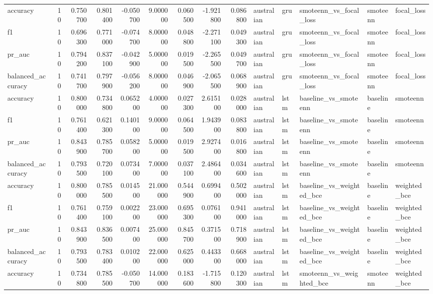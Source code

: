 \begin{tabular}{lrrrrrrrrlllll}
accuracy & 10 & 0.750700 & 0.801400 & -0.050700 & 9.000000 & 0.060500 & -1.921800 & 0.086800 & australian & gru & smoteenn_vs_focal_loss & smoteenn & focal_loss \\
f1 & 10 & 0.696300 & 0.771000 & -0.074700 & 8.000000 & 0.048800 & -2.271100 & 0.049300 & australian & gru & smoteenn_vs_focal_loss & smoteenn & focal_loss \\
pr_auc & 10 & 0.794200 & 0.837100 & -0.042900 & 5.000000 & 0.019500 & -2.265500 & 0.049700 & australian & gru & smoteenn_vs_focal_loss & smoteenn & focal_loss \\
balanced_accuracy & 10 & 0.741700 & 0.797900 & -0.056200 & 8.000000 & 0.046900 & -2.065500 & 0.068900 & australian & gru & smoteenn_vs_focal_loss & smoteenn & focal_loss \\
accuracy & 10 & 0.800000 & 0.734800 & 0.065200 & 4.000000 & 0.027300 & 2.615100 & 0.028000 & australian & lstm & baseline_vs_smoteenn & baseline & smoteenn \\
f1 & 10 & 0.761400 & 0.621300 & 0.140100 & 9.000000 & 0.064500 & 1.943900 & 0.083800 & australian & lstm & baseline_vs_smoteenn & baseline & smoteenn \\
pr_auc & 10 & 0.843900 & 0.785700 & 0.058200 & 5.000000 & 0.019500 & 2.927400 & 0.016800 & australian & lstm & baseline_vs_smoteenn & baseline & smoteenn \\
balanced_accuracy & 10 & 0.793500 & 0.720100 & 0.073400 & 7.000000 & 0.037100 & 2.486400 & 0.034600 & australian & lstm & baseline_vs_smoteenn & baseline & smoteenn \\
accuracy & 10 & 0.800000 & 0.785500 & 0.014500 & 21.000000 & 0.544900 & 0.699400 & 0.502000 & australian & lstm & baseline_vs_weighted_bce & baseline & weighted_bce \\
f1 & 10 & 0.761400 & 0.759100 & 0.002200 & 23.000000 & 0.695300 & 0.076100 & 0.941000 & australian & lstm & baseline_vs_weighted_bce & baseline & weighted_bce \\
pr_auc & 10 & 0.843900 & 0.836500 & 0.007400 & 25.000000 & 0.845700 & 0.371500 & 0.718900 & australian & lstm & baseline_vs_weighted_bce & baseline & weighted_bce \\
balanced_accuracy & 10 & 0.793500 & 0.783400 & 0.010200 & 22.000000 & 0.625000 & 0.443300 & 0.668000 & australian & lstm & baseline_vs_weighted_bce & baseline & weighted_bce \\
accuracy & 10 & 0.734800 & 0.785500 & -0.050700 & 14.000000 & 0.183600 & -1.715800 & 0.120300 & australian & lstm & smoteenn_vs_weighted_bce & smoteenn & weighted_bce \\

\end{tabular}

